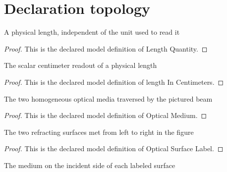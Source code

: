 \section{Declaration topology}
\begin{definition}
  \label{def:physics:phyx-mini-0033:phyxminiproblems-problemphyxmini0033-lengthquantity}
  A physical length, independent of the unit used to read it
\end{definition}
\begin{proof}
  This is the declared model definition of Length Quantity.
\end{proof}
\begin{definition}
  \label{def:physics:phyx-mini-0033:phyxminiproblems-problemphyxmini0033-lengthincentimeters}
  The scalar centimeter readout of a physical length
\end{definition}
\begin{proof}
  This is the declared model definition of length In Centimeters.
\end{proof}
\begin{definition}
  \label{def:physics:phyx-mini-0033:phyxminiproblems-problemphyxmini0033-opticalmedium}
  The two homogeneous optical media traversed by the pictured beam
\end{definition}
\begin{proof}
  This is the declared model definition of Optical Medium.
\end{proof}
\begin{definition}
  \label{def:physics:phyx-mini-0033:phyxminiproblems-problemphyxmini0033-opticalsurfacelabel}
  The two refracting surfaces met from left to right in the figure
\end{definition}
\begin{proof}
  This is the declared model definition of Optical Surface Label.
\end{proof}
\begin{definition}
  \label{def:physics:phyx-mini-0033:phyxminiproblems-problemphyxmini0033-incidentmedium}
  The medium on the incident side of each labeled surface
\end{definition}
